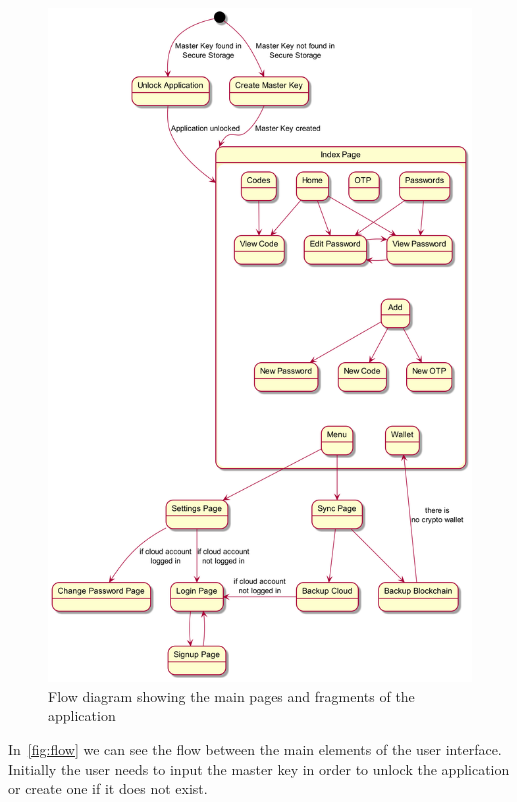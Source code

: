 \documentclass[a4paper,12pt]{report}
\begin{document}
\begin{figure}[H]
    \centering
    \includegraphics[scale=0.23]{diagrams/state/flow.png}
    \caption{Flow diagram showing the main pages and fragments of the application}\label{fig:flow}
\end{figure}

In~\autoref{fig:flow} we can see the flow between the main elements of the user
interface. Initially the user needs to input the master key in order to unlock
the application or create one if it does not exist.
\end{document}
